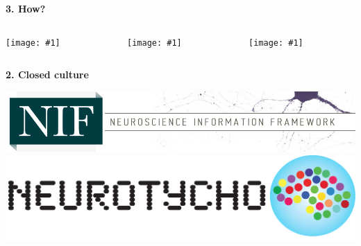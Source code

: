 \documentclass[17pt]{beamer}
\newcommand{\cf}[2]{
    \begin{center}
      \texttt{[image: \#1]}
    \end{center}
  }
\begin{document}
\begin{frame}[plain]
  \vspace{-40pt}
  \begin{center}
    \begin{huge}\textbf{3. How?}\end{huge}
  \end{center}
  \vspace{1em}
  \begin{columns}
    \begin{column}{0.3\textwidth}
      \cf{figshare}{1.0}
    \end{column}
    \begin{column}{0.35\textwidth}
      \cf{datadryad}{1.0}
    \end{column}
    \begin{column}{0.25\textwidth}
      \cf{datahub}{1.0}
    \end{column}
  \end{columns}
\end{frame}

\begin{frame}[plain]
  \vspace{-12pt}
  \begin{center}
    \begin{huge}\textbf{2. Closed culture}\end{huge}
  \end{center}
  \vspace{0.5em}
  \begin{center}
    \includegraphics[width=0.8\columnwidth]{nif} \\ \vspace{1em}
    \includegraphics[width=0.8\columnwidth]{neurotycho}
  \end{center}
\end{frame}
\end{document}
